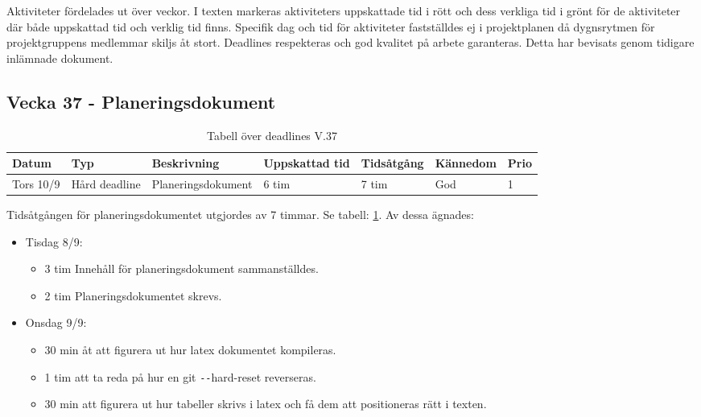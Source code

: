 \documentclass{TDP003mall}
\begin{document}
 Aktiviteter fördelades ut över veckor. I texten markeras aktiviteters uppskattade tid i rött och dess verkliga tid i grönt för de aktiviteter där både uppskattad tid och verklig tid finns. Specifik dag och tid för aktiviteter fastställdes ej i projektplanen då dygnsrytmen för projektgruppens medlemmar skiljs åt stort. Deadlines respekteras och god kvalitet på arbete garanteras. Detta har bevisats genom tidigare inlämnade dokument.

\newpage
 
 \subsection*{Vecka 37 - Planeringsdokument}

 \begin{table}[h!]
   \caption{Tabell över deadlines V.37\label{tab:2}}
   \begin{tabularx}{\linewidth}{|l|l|X|l|l|l|l|}
  \hline
  Datum     & Typ           & Beskrivning        & Uppskattad tid & Tidsåtgång & Kännedom & Prio \\ [0.5ex]
  \hline                                             
  Tors 10/9 & Hård deadline & Planeringsdokument & 6 tim          & 7 tim      & God      & 1    \\
  \hline
   \end{tabularx}   
\end{table}

Tidsåtgången för planeringsdokumentet utgjordes av 7 timmar. Se tabell: \ref{tab:2}. Av dessa ägnades:
\begin{itemize}
  \item Tisdag 8/9:
  \begin{itemize}
    \item 3 tim Innehåll för planeringsdokument sammanställdes.
    \item 2 tim Planeringsdokumentet skrevs.
  \end{itemize}
  \item Onsdag 9/9:
  \begin{itemize}
    \item 30 min åt att figurera ut hur latex dokumentet kompileras.
    \item 1 tim att ta reda på hur en git \texttt{-{}-}hard-reset reverseras.
    \item 30 min att figurera ut hur tabeller skrivs i latex och få dem att positioneras rätt i texten.\\
  \end{itemize}
      \end{itemize}
\end{document}
